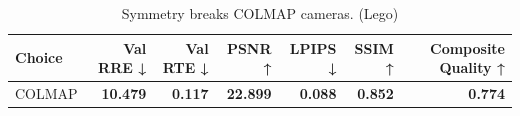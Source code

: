 \begin{table}[H]
\caption{\ifdefined\customcaption \customcaption \else Symmetry breaks COLMAP cameras. (Lego) \fi}
\label{tab:99_lego_symmetry_lego}
\centering
\scriptsize
\begin{tabular}{lrrrrrr}
\toprule
Choice & Val RRE ↓ & Val RTE ↓ & PSNR ↑ & LPIPS ↓ & SSIM ↑ & Composite Quality ↑ \\
\midrule
COLMAP & \textbf{10.479} & \textbf{0.117} & \textbf{22.899} & \textbf{0.088} & \textbf{0.852} & \textbf{0.774} \\
\bottomrule
\end{tabular}
\end{table}